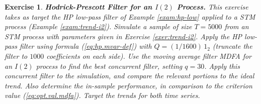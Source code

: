 \documentclass[a4paper]{book}
\newtheorem{Exercise}{Exercise}
\begin{document}
\begin{Exercise} {\bf  Hodrick-Prescott Filter for an $I(2)$ Process.} \rm
\label{exer:hptrend-mdfa}
This exercise takes as target the HP low-pass filter of Example
 \ref{exam:hp-low} applied to a STM process (Example \ref{exam:trend-i2}).
 Simulate a sample of size $T=5000$ from an STM process with parameters
 given in Exercise \ref{exer:trend-i2}.   Apply the HP low-pass filter
 using formula (\ref{eq:hp.mvar-def}) with $ Q = (1/1600) \, 1_2 $
(truncate the filter to $1000$ coefficients on each side).
 Use the moving average filter  MDFA  for an $I(2)$ process  to find the best
 concurrent filter, setting $q= 30$.
   Apply this concurrent filter
 to the simulation, and compare the relevant portions to the ideal trend.
 Also determine the in-sample performance, in comparison to the criterion value
 (\ref{eq:opt.val.mdfa}).   Target the trends for both time series.
\end{Exercise}
\end{document}
